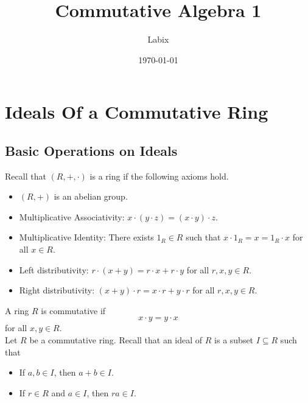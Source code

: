 \documentclass[a4paper]{article}
\title{Commutative Algebra 1}
\author{Labix}
\date{\today}
\begin{document}
\maketitle
\begin{abstract}
\end{abstract}
\pagebreak
\tableofcontents

\pagebreak
\section{Ideals Of a Commutative Ring}
\subsection{Basic Operations on Ideals}
Recall that $(R,+,\cdot)$ is a ring if the following axioms hold. 
\begin{itemize}
\item $(R,+)$ is an abelian group. 
\item Multiplicative Associativity: $x\cdot(y\cdot z)=(x\cdot y)\cdot z$. 
\item Multiplicative Identity: There exists $1_R\in R$ such that $x\cdot 1_R=x=1_R\cdot x$ for all $x\in R$. 
\item Left distributivity: $r\cdot(x+y)=r\cdot x+r\cdot y$ for all $r,x,y\in R$. 
\item Right distributivity: $(x+y)\cdot r=x\cdot r+y\cdot r$ for all $r,x,y\in R$. 
\end{itemize}
A ring $R$ is commutative if $$x\cdot y=y\cdot x$$ for all $x,y\in R$. \\

Let $R$ be a commutative ring. Recall that an ideal of $R$ is a subset $I\subseteq R$ such that
\begin{itemize}
\item If $a,b\in I$, then $a+b\in I$. 
\item If $r\in R$ and $a\in I$, then $ra\in I$. 
\end{itemize}
\end{document}
